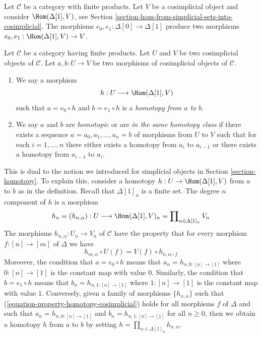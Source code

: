 \noindent
Let $\mathcal{C}$ be a category with finite products. Let $V$ be a
cosimplicial object and consider $\Hom(\Delta[1], V)$, see
Section \ref{section-hom-from-simplicial-sets-into-cosimplicial}.
The morphisms $e_0, e_1 : \Delta[0] \to \Delta[1]$
produce two morphisms $e_0, e_1 : \Hom(\Delta[1], V) \to V$.

\begin{definition}
\label{definition-homotopy-cosimplicial}
Let $\mathcal{C}$ be a category having finite products.
Let $U$ and $V$ be two cosimplicial objects of $\mathcal{C}$.
Let $a, b : U \to V$ be two morphisms of cosimplicial objects
of $\mathcal{C}$.
\begin{enumerate}
\item We say a morphism
$$
h : U \longrightarrow \Hom(\Delta[1], V)
$$
such that $a = e_0 \circ h$ and $b = e_1 \circ h$ is a
{\it homotopy from $a$ to $b$}.
\item We say $a$ and $b$ are {\it homotopic} or are
{\it in the same homotopy class} if there exists a sequence
$a = a_0, a_1, \ldots, a_n = b$ of morphisms from $U$ to $V$
such that for each $i = 1, \ldots, n$ there either exists a
homotopy from $a_i$ to $a_{i - 1}$ or there exists a homotopy
from $a_{i - 1}$ to $a_i$.
\end{enumerate}
\end{definition}

\noindent
This is dual to the notion we introduced for simplicial objects in
Section \ref{section-homotopy}. To explain this, consider a
homotopy $h : U \to \Hom(\Delta[1], V)$ from $a$ to $b$ as
in the definition. Recall that $\Delta[1]_n$ is a finite
set. The degree $n$ component of $h$ is a morphism
$$
h_n = (h_{n, \alpha}) :
U
\longrightarrow
\Hom(\Delta[1], V)_n =
\prod\nolimits_{\alpha \in \Delta[1]_n} V_n
$$
The morphisms $h_{n, \alpha} : U_n \to V_n$ of $\mathcal{C}$ have the
property that for every morphism $f : [n] \to [m]$
of $\Delta$ we have
\begin{equation}
\label{equation-property-homotopy-cosimplicial}
h_{m, \alpha} \circ U(f) = V(f) \circ h_{n, \alpha \circ f}
\end{equation}
Moreover, the condition that $a = e_0 \circ h$ means that
$a_n = h_{n, 0 : [n] \to [1]}$ where $0 : [n] \to [1]$ is the
constant map with value $0$. Similarly, the condition that
$b = e_1 \circ h$ means that $b_n = h_{n, 1 : [n] \to [1]}$
where $1 : [n] \to [1]$ is the constant map with value $1$.
Conversely, given a family of morphisms $\{h_{n, \alpha}\}$
such that (\ref{equation-property-homotopy-cosimplicial})
holds for all morphisms $f$ of $\Delta$ and such that
$a_n = h_{n, 0 : [n] \to [1]}$ and $b_n = h_{n, 1 : [n] \to [1]}$
for all $n \geq 0$, then we obtain a homotopy $h$ from $a$ to $b$ by setting
$h = \prod_{\alpha \in \Delta[1]_n} h_{n, \alpha}$.

